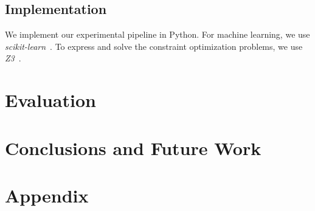 \documentclass{article}
\begin{document}
\subsection{Implementation}

We implement our experimental pipeline in Python.
For machine learning, we use \emph{scikit-learn}~\cite{pedregosa2011scikit-learn}.
To express and solve the constraint optimization problems, we use \emph{Z3}~\cite{deMoura2008z3}.

\section{Evaluation}
\label{sec:evaluation}

\section{Conclusions and Future Work}
\label{sec:conclusion}

\printbibliography

\appendix

\section{Appendix}
\label{sec:appendix}
\end{document}
